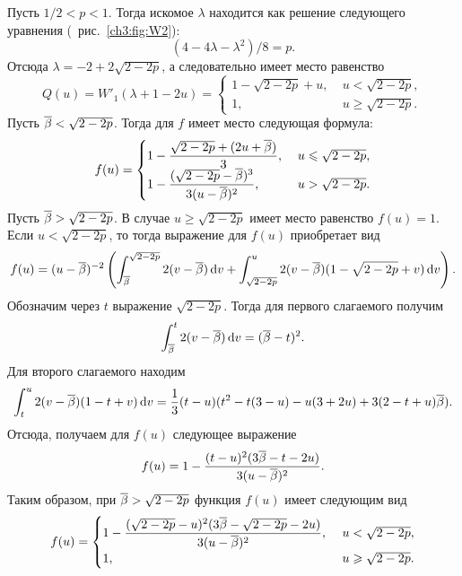 {\begin{example}
  Пусть $1/2 < p < 1$.
  Тогда искомое $\lambda$ находится как решение следующего уравнения (\seename~рис.~\ref{ch3:fig:W2}):
  \[
  (4 - 4\lambda - \lambda^2)/8 = p.
  \]
  Отсюда $\lambda = -2 + 2\sqrt{2 - 2p}$, а следовательно имеет место равенство
  \begin{equation*}
    Q(u) =
    W'_1(\lambda + 1 - 2u) =
    \begin{cases}
      1 - \sqrt{2 - 2p} + u, &\; u < \sqrt{2 - 2p},\\
      1, &\; u \geqslant \sqrt{2 - 2p}.
    \end{cases}
  \end{equation*}
  Пусть ${{\overline{\beta}}} < \sqrt{2 - 2p}$. Тогда для $f$ имеет место следующая формула:
  \begin{equation*}
    f(u) = \begin{cases}
      {\displaystyle 1 - \frac{\sqrt{2 - 2p} + (2u + \ensuremath{{{\overline{\beta}}}})}{3}}, &\; u \leqslant \sqrt{2 - 2p},\\
      {\displaystyle 1 - \frac{(\sqrt{2 - 2p} - {{\overline{\beta}}})^3}{3(u - {{\overline{\beta}}})^2}}, &\; u > \sqrt{2 - 2p}.
    \end{cases}
  \end{equation*}
  Пусть ${{\overline{\beta}}} > \sqrt{2-2p}$.
  В случае $u \geq \sqrt{2 - 2p}$ имеет место равенство $f(u) = 1$.
  Если $u < \sqrt{2 - 2p}$, то тогда выражение для $f(u)$ приобретает вид
  \begin{equation*}
    f(u) = (u-{{\overline{\beta}}})^{-2} \left( 
      \int_{{{\overline{\beta}}}}^{\sqrt{2-2p}} 2(v-{{\overline{\beta}}}) \mathop{}\!\mathrm{d} v +
      \int_{\sqrt{2-2p}}^u 2(v-{{\overline{\beta}}}) (1-\sqrt{2 - 2p} + v) \mathop{}\!\mathrm{d} v
    \right).
  \end{equation*}
  Обозначим через $t$ выражение $\sqrt{2-2p}$.
  Тогда для первого слагаемого получим
  \begin{equation*}
      \int_{{{\overline{\beta}}}}^t 2(v-{{\overline{\beta}}}) \mathop{}\!\mathrm{d} v = ({{\overline{\beta}}} - t)^2.
  \end{equation*}
  Для второго слагаемого находим
  \begin{equation*}
    \int_t^u 2(v - {{\overline{\beta}}}) (1 - t + v) \mathop{}\!\mathrm{d} v = \frac{1}{3} (t - u)(t^2 - t(3-u) - u(3 + 2u) + 3(2-t+u){{\overline{\beta}}}).
  \end{equation*}
  Отсюда, получаем для $f(u)$ следующее выражение
  \begin{equation*}
    f(u) = 1 - \frac{(t-u)^2(3{{\overline{\beta}}} - t - 2u)}{3(u-{{\overline{\beta}}})^2}.
  \end{equation*}
  Таким образом, при ${{\overline{\beta}}} > \sqrt{2-2p}$ функция $f(u)$ имеет следующим вид
  \begin{equation*}
    f(u) = \begin{cases}
      {\displaystyle 1 - \frac{(\sqrt{2-2p}-u)^2(3\ensuremath{{{\overline{\beta}}}}- \sqrt{2-2p} - 2u)}{3(u-\ensuremath{{{\overline{\beta}}}})^2}},\ & u < \sqrt{2-2p}, \\
      1,\ & u \geqslant \sqrt{2-2p}.
    \end{cases}
  \end{equation*}
  

\end{example}}
